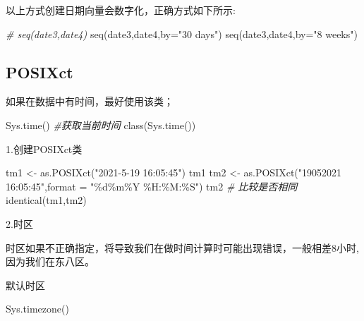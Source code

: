 \documentclass[
]{book}
\newenvironment{Shaded}{\begin{snugshade}}{\end{snugshade}}
\newcommand{\AttributeTok}[1]{\textcolor[rgb]{0.77,0.63,0.00}{#1}}
\newcommand{\CommentTok}[1]{\textcolor[rgb]{0.56,0.35,0.01}{\textit{#1}}}
\newcommand{\FunctionTok}[1]{\textcolor[rgb]{0.00,0.00,0.00}{#1}}
\newcommand{\NormalTok}[1]{#1}
\newcommand{\OtherTok}[1]{\textcolor[rgb]{0.56,0.35,0.01}{#1}}
\newcommand{\StringTok}[1]{\textcolor[rgb]{0.31,0.60,0.02}{#1}}
\begin{document}
以上方式创建日期向量会数字化，正确方式如下所示:

\begin{Shaded}
\begin{Highlighting}[]
\CommentTok{\# seq(date3,date4)}
\FunctionTok{seq}\NormalTok{(date3,date4,}\AttributeTok{by=}\StringTok{"30 days"}\NormalTok{)}
\FunctionTok{seq}\NormalTok{(date3,date4,}\AttributeTok{by=}\StringTok{"8 weeks"}\NormalTok{)}
\end{Highlighting}
\end{Shaded}

\hypertarget{datetime:base-R-POSIXct}{%
\subsection{POSIXct}\label{datetime:base-R-POSIXct}}

如果在数据中有时间，最好使用该类；

\begin{Shaded}
\begin{Highlighting}[]
\FunctionTok{Sys.time}\NormalTok{() }\CommentTok{\#获取当前时间}
\FunctionTok{class}\NormalTok{(}\FunctionTok{Sys.time}\NormalTok{())}
\end{Highlighting}
\end{Shaded}

1.创建POSIXct类

\begin{Shaded}
\begin{Highlighting}[]
\NormalTok{tm1 }\OtherTok{\textless{}{-}} \FunctionTok{as.POSIXct}\NormalTok{(}\StringTok{"2021{-}5{-}19 16:05:45"}\NormalTok{)}
\NormalTok{tm1}
\NormalTok{tm2 }\OtherTok{\textless{}{-}} \FunctionTok{as.POSIXct}\NormalTok{(}\StringTok{"19052021 16:05:45"}\NormalTok{,}\AttributeTok{format =} \StringTok{"\%d\%m\%Y \%H:\%M:\%S"}\NormalTok{)}
\NormalTok{tm2}
\CommentTok{\# 比较是否相同}
\FunctionTok{identical}\NormalTok{(tm1,tm2)}
\end{Highlighting}
\end{Shaded}

2.时区

时区如果不正确指定，将导致我们在做时间计算时可能出现错误，一般相差8小时,因为我们在东八区。

默认时区

\begin{Shaded}
\begin{Highlighting}[]
\FunctionTok{Sys.timezone}\NormalTok{()}
\end{Highlighting}
\end{Shaded}
\end{document}
